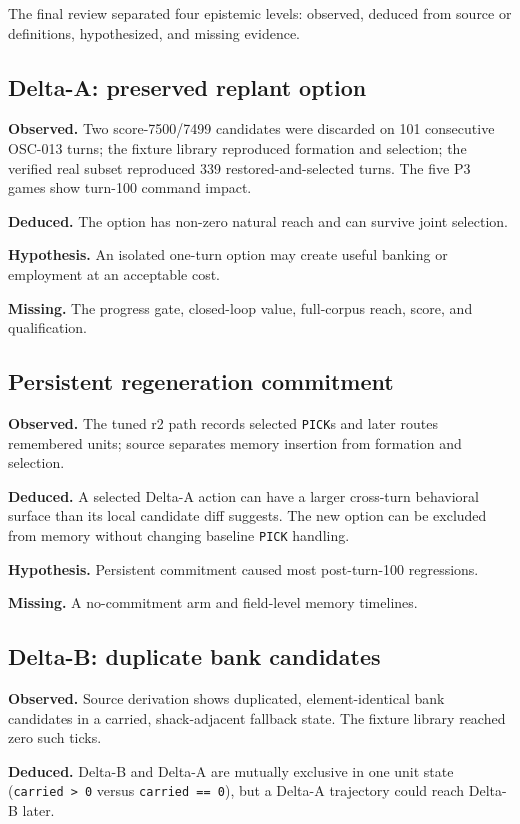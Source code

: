 \documentclass[10pt,a4paper]{article}
\newcommand{\code}[1]{\texttt{#1}}
\begin{document}
The final review separated four epistemic levels: observed, deduced from source or definitions,
hypothesized, and missing evidence.

\subsection{Delta-A: preserved replant option}

\textbf{Observed.} Two score-7500/7499 candidates were discarded on 101 consecutive OSC-013 turns;
the fixture library reproduced formation and selection; the verified real subset reproduced 339
restored-and-selected turns. The five P3 games show turn-100 command impact.

\textbf{Deduced.} The option has non-zero natural reach and can survive joint selection.

\textbf{Hypothesis.} An isolated one-turn option may create useful banking or employment at an
acceptable cost.

\textbf{Missing.} The progress gate, closed-loop value, full-corpus reach, score, and qualification.

\subsection{Persistent regeneration commitment}

\textbf{Observed.} The tuned r2 path records selected \code{PICK}s and later routes remembered
units; source separates memory insertion from formation and selection.

\textbf{Deduced.} A selected Delta-A action can have a larger cross-turn behavioral surface than
its local candidate diff suggests. The new option can be excluded from memory without changing
baseline \code{PICK} handling.

\textbf{Hypothesis.} Persistent commitment caused most post-turn-100 regressions.

\textbf{Missing.} A no-commitment arm and field-level memory timelines.

\subsection{Delta-B: duplicate bank candidates}

\textbf{Observed.} Source derivation shows duplicated, element-identical bank candidates in a
carried, shack-adjacent fallback state. The fixture library reached zero such ticks.

\textbf{Deduced.} Delta-B and Delta-A are mutually exclusive in one unit state
(\code{carried > 0} versus \code{carried == 0}), but a Delta-A trajectory could reach Delta-B later.
\end{document}

